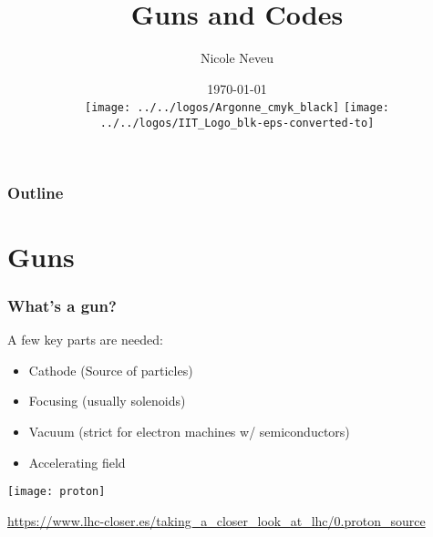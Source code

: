 \documentclass[professionalfonts,t]{beamer}
\title[USPAS Fundamentals, June 4-15, 2018]{Guns and Codes}
\author[N.Neveu]{{\Large Nicole Neveu}}
\institute[ANL, IIT] %
{   Illinois Institute of Technology \\
	Argonne National Laboratory \\
    \url{nneveu@anl.gov} 
}
\date{ \today \\
\texttt{[image: ../../logos/Argonne\_cmyk\_black]}%
\hfill \hfill \hfill%
\texttt{[image: ../../logos/IIT\_Logo\_blk-eps-converted-to]}%
}
\begin{document}
\begin{frame}
  \titlepage
\end{frame}


\begin{frame}
	\frametitle{Outline}
	\tableofcontents
\end{frame}







\section{Guns}

\begin{frame}
	\frametitle{What's a gun?}
	A few key parts are needed:
	\begin{itemize}
		\item Cathode (Source of particles)
		\item Focusing (usually solenoids)
		\item Vacuum (strict for electron machines w/ semiconductors)
		\item Accelerating field
	\end{itemize}

\vspace{1em}
\centering
\texttt{[image: proton]}

\tiny
\url{https://www.lhc-closer.es/taking_a_closer_look_at_lhc/0.proton_source}
\end{frame}
\end{document}
